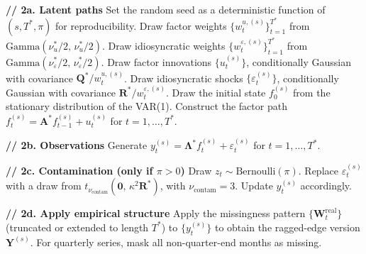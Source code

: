 \documentclass[11pt, a4paper, oneside]{article}
\newcommand{\mY}{\mathbf{Y}}
\newcommand{\mL}{\boldsymbol{\Lambda}}
\begin{document}
\begin{algorithm}[H]
\begin{algorithmic}[1]
            \vspace{0.2em}
            \State \textbf{// 2a. Latent paths}
            \State Set the random seed as a deterministic function
                   of $(s, T^*, \pi)$ for reproducibility.
            \State Draw factor weights $\{w_t^{u, (s)}\}_{t=1}^{T^*}$
                   from $\mathrm{Gamma}(\nu_u^*/2,\, \nu_u^*/2)$.
            \State Draw idiosyncratic weights
                   $\{w_t^{\varepsilon, (s)}\}_{t=1}^{T^*}$
                   from $\mathrm{Gamma}(\nu_\varepsilon^*/2,\, \nu_\varepsilon^*/2)$.
            \State Draw factor innovations $\{u_t^{(s)}\}$,
                   conditionally Gaussian with covariance
                   $\mathbf{Q}^* / w_t^{u, (s)}$.
            \State Draw idiosyncratic shocks
                   $\{\varepsilon_t^{(s)}\}$,
                   conditionally Gaussian with covariance
                   $\mathbf{R}^* / w_t^{\varepsilon, (s)}$.
            \State Draw the initial state $f_0^{(s)}$ from the
                   stationary distribution of the VAR(1).
            \State Construct the factor path
                   $f_t^{(s)} = \mathbf{A}^* f_{t-1}^{(s)} + u_t^{(s)}$
                   for $t = 1, \ldots, T^*$.
            
            \vspace{0.2em}
            \State \textbf{// 2b. Observations}
            \State Generate
                   $y_t^{(s)} = \mL^* f_t^{(s)} + \varepsilon_t^{(s)}$
                   for $t = 1, \ldots, T^*$.
            
            \vspace{0.2em}
            \State \textbf{// 2c. Contamination (only if $\pi > 0$)}
                    \State Draw $z_t \sim \mathrm{Bernoulli}(\pi)$.
                        \State Replace $\varepsilon_t^{(s)}$ with a
                               draw from
                               $t_{\nu_{\mathrm{contam}}}(\mathbf{0},\, \kappa^2 \mathbf{R}^*)$,
                               with $\nu_{\mathrm{contam}} = 3$.
                        \State Update $y_t^{(s)}$ accordingly.
                    \EndIf
                \EndFor
            \EndIf
            
            \vspace{0.2em}
            \State \textbf{// 2d. Apply empirical structure}
            \State Apply the missingness pattern
                   $\{\mathbf{W}_t^{\mathrm{real}}\}$
                   (truncated or extended to length $T^*$) to
                   $\{y_t^{(s)}\}$ to obtain the ragged-edge
                   version $\mY^{(s)}$.
            \State For quarterly series, mask all non-quarter-end
                   months as missing.
            

\end{algorithmic}
\end{algorithm}
\end{document}
